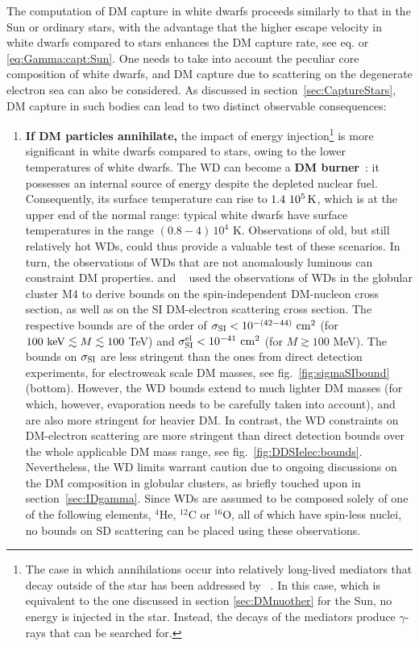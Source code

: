 The computation of DM capture in white dwarfs proceeds similarly to that in the Sun or ordinary stars, 
with the advantage that the higher escape velocity in white dwarfs compared to stars enhances the DM capture rate, see eq. or \eqref{eq:Gamma:capt:Sun}.
One needs to take into account the peculiar core composition of white dwarfs, and DM capture due to scattering on the degenerate electron sea  can also be considered.
As discussed in section~\ref{sec:CaptureStars}, DM capture in such bodies can lead to two distinct observable consequences:
\begin{enumerate}

 \item {\bf If DM particles annihilate,} the impact of energy injection\footnote{The case in which annihilations occur into relatively long-lived mediators that decay outside of the star has been addressed by ~\cite{DMinWD}. In this case, which is equivalent to the one discussed in section \ref{sec:DMnuother} for the Sun, no energy is injected in the star. Instead, the decays of the mediators produce $\gamma$-rays that can be searched for.}
 is more significant in white dwarfs compared to stars, owing to the lower temperatures of white dwarfs.
 The WD can become a {\bf DM burner}~\cite{DMinWD}:
 it possesses an internal source of energy despite the depleted 
 nuclear fuel. Consequently, its surface temperature can rise to $1.4 \ 10^5\,{\rm K}$, which is at the upper end of the normal range: typical white dwarfs have surface temperatures in the range  
 $(0.8-4)\,10^4$ K. Observations of old, but still relatively hot WDs, could thus 
 provide a valuable test of these scenarios.
 In turn, the observations of WDs that are not anomalously luminous  can constraint DM properties.  and ~\cite{DMinWD} used the observations of WDs in the globular cluster M4 to derive bounds on the spin-independent DM-nucleon cross section, as well as on the SI DM-electron scattering cross section. The respective bounds are of the order of $\sigma_{\rm SI}< 10^{-(42-44)} \ {\rm cm}^2$ (for $100 \ {\rm keV} \lesssim M \lesssim 100$ TeV) and $\sigma^{\rm el}_{\rm SI} < 10^{-41} \ {\rm cm}^2$ (for $M \gtrsim 100$ MeV). 
The bounds on $\sigma_{\rm SI}$ are less stringent than the ones from direct detection experiments, for electroweak scale DM masses, see fig.~\ref{fig:sigmaSIbound} (bottom).
However, the WD bounds extend to much lighter DM masses (for which, however, evaporation needs to be carefully taken into account), and are also more stringent for heavier DM. 
In contrast, the WD constraints on DM-electron scattering are more stringent than direct detection bounds
over the whole applicable DM mass range, see fig.~\ref{fig:DDSIelec:bounds}. 
Nevertheless, the WD limits warrant caution due to ongoing discussions on the DM composition in globular clusters, as briefly touched upon in section~\ref{sec:IDgamma}. Since WDs are assumed to be composed solely of one of the following elements, ${}^4$He, ${}^{12}$C or ${}^{16}$O, all of which have spin-less nuclei, no bounds on SD scattering can be placed using these observations.




\end{enumerate}
